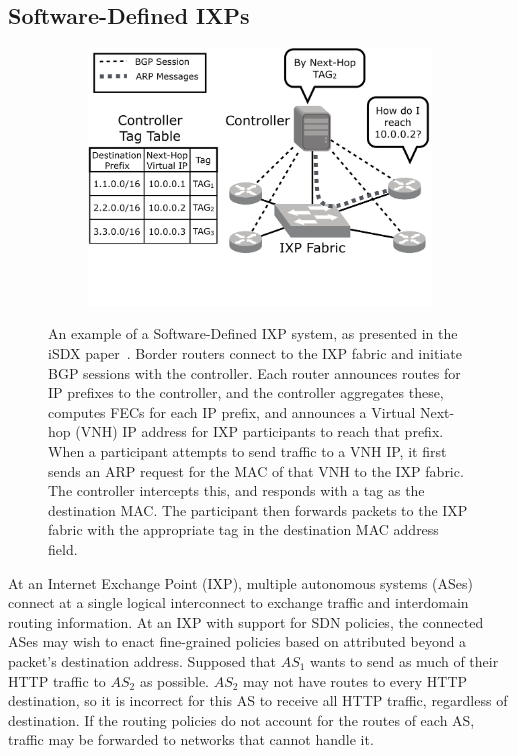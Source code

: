 \subsection{Software-Defined IXPs}
\begin{figure}[t!] 
\begin{minipage}{1\linewidth}
\begin{subfigure}[b]{0.96\linewidth}
\includegraphics[width=\linewidth,trim={0 5cm 0 0}]{figures/sdx_example}
\end{subfigure} 
\end{minipage} 
\caption{An example of a Software-Defined IXP system, as presented in the iSDX paper~\cite{isdx}. Border routers connect to the IXP fabric and initiate BGP sessions with the controller. Each router announces routes for IP prefixes to the controller, and the controller aggregates these, computes FECs for each IP prefix, and announces a Virtual Next-hop (VNH) IP address for IXP participants to reach that prefix. When a participant attempts to send traffic to a VNH IP, it first sends an ARP request for the MAC of that VNH to the IXP fabric. The controller intercepts this, and responds with a tag as the destination MAC. The participant then forwards packets to the IXP fabric with the appropriate tag in the destination MAC address field.}
\label{fig:sdx_example}
\end{figure}
At an Internet Exchange Point (IXP), multiple autonomous systems (ASes)
connect at a single logical interconnect to exchange traffic and
interdomain routing information.  At an IXP with support for SDN
policies, the connected ASes may wish to enact fine-grained 
policies based on attributed beyond a packet's destination
address. Supposed that $AS_1$ wants to send as much of their HTTP traffic
to $AS_2$ as possible. $AS_2$ may not have routes to every HTTP
destination, so it is incorrect for this AS to receive all HTTP traffic,
regardless of destination. If
the routing policies do not account for the routes of each AS, traffic
may be forwarded to networks that cannot handle it.

